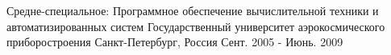 
\begin{cventries}
  \cventry
    {Средне-специальное: Программное обеспечение вычислительной техники и автоматизированных систем}
    {Государственный университет аэрокосмического приборостроения}
    {Санкт-Петербург, Россия}
    {Сент. 2005 - Июнь. 2009}
    {}
\end{cventries}